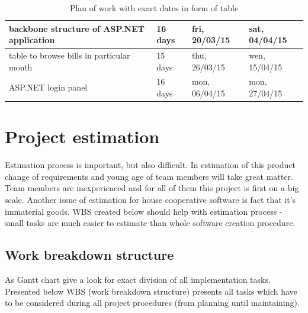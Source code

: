 \documentclass[a4paper,11pt,onecolumn,oneside]{book}
\begin{document}
\begin{table}[h]
\begin{tabular}{|l|l|l|l|}
backbone structure of ASP.NET application                                                                   & 16 days               & fri, 20/03/15               & sat, 04/04/15             \\ \hline
table to browse bills in particular month                                                                   & 15 days               & thu, 26/03/15               & wen, 15/04/15             \\ \hline
ASP.NET login panel                                                                                         & 16 days               & mon, 06/04/15               & mon, 27/04/15             \\ \hline
\end{tabular}
\caption{Plan of work with exact dates in form of table}
\end{table}




\chapter{Project estimation}

Estimation process is important, but also difficult. In estimation of this product change of requirements and young age of team members will take great matter. Team members are inexperienced and for all of them this project is first on a big scale. Another issue of estimation for house cooperative software is fact that it's immaterial goods. WBS created below should help with estimation process - small tasks are much easier to estimate than whole software creation procedure. 

\section{Work breakdown structure}
As Gantt chart give a look for exact division of all implementation tasks. Presented below WBS (work breakdown structure) presents all tasks which have to be considered during all project procedures (from planning until maintaining).
\end{document}
